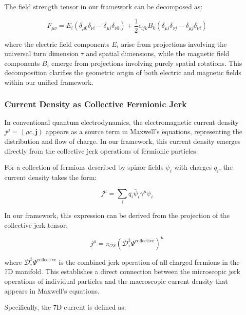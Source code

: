 \documentclass{article}
\begin{document}
The field strength tensor in our framework can be decomposed as:

\begin{equation}
F_{\mu\nu} = E_i(\delta_{\mu 0}\delta_{\nu i} - \delta_{\mu i}\delta_{\nu 0}) + \frac{1}{2}\epsilon_{ijk}B_k(\delta_{\mu i}\delta_{\nu j} - \delta_{\mu j}\delta_{\nu i})
\end{equation}

where the electric field components $E_i$ arise from projections involving the universal turn dimension $\tau$ and spatial dimensions, while the magnetic field components $B_i$ emerge from projections involving purely spatial rotations. This decomposition clarifies the geometric origin of both electric and magnetic fields within our unified framework.

\subsubsection{Current Density as Collective Fermionic Jerk}

In conventional quantum electrodynamics, the electromagnetic current density $j^\mu = (\rho c, \mathbf{j})$ appears as a source term in Maxwell's equations, representing the distribution and flow of charge. In our framework, this current density emerges directly from the collective jerk operations of fermionic particles.

For a collection of fermions described by spinor fields $\psi_i$ with charges $q_i$, the current density takes the form:

\begin{equation}
j^\mu = \sum_i q_i \bar{\psi}_i \gamma^\mu \psi_i
\end{equation}

In our framework, this expression can be derived from the projection of the collective jerk tensor:

\begin{equation}
j^\mu = \pi_{\mathcal{OS}}(\mathcal{D}_\tau^3 \Psi^{\text{collective}})^\mu
\end{equation}

where $\mathcal{D}_\tau^3 \Psi^{\text{collective}}$ is the combined jerk operation of all charged fermions in the 7D manifold. This establishes a direct connection between the microscopic jerk operations of individual particles and the macroscopic current density that appears in Maxwell's equations.

Specifically, the 7D current is defined as:
\end{document}
